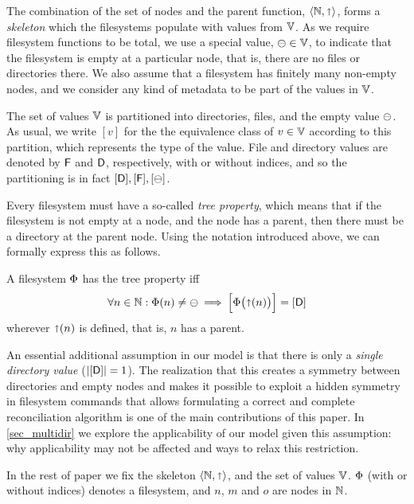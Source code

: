 
The combination of the set of nodes and the parent function,
$\langle \mathbb{N}, \mathord{\shortuparrow} \rangle$, forms a \emph{skeleton}
which the filesystems populate with values from $\mathbb{V}$.
As we require filesystem functions to be total,
we use a special value, $\ominus\in\mathbb{V}$, to indicate that the filesystem
is empty at a particular node, that is, there are no files or directories there.
We also assume that a filesystem has finitely many non-empty nodes,
and we consider any kind of metadata to be part of the values in $\mathbb{V}$.

\begin{mydef}
The set of values $\mathbb{V}$ is partitioned into directories, files, and the empty value $\ominus$.
As usual, we write $[v]$ for the the equivalence class of $v\in\mathbb{V}$ according to this partition,
which represents the type of the value.
File and directory values are denoted by $\mathsf{F}$ and $\mathsf{D}$, respectively,
with or without indices, and so the partitioning is in fact $[\mathsf{D}], [\mathsf{F}], [\ominus]$.
\end{mydef}


Every filesystem must have a so-called \emph{tree property}, which means that
if the filesystem is not empty at a node, and the node has a parent,
then there must be a directory at the parent node.
Using the notation introduced above, we can formally express this as follows.
\begin{mydef}
A filesystem $\Phi$ has the tree property iff
\[ \forall n\in\mathbb{N}:
\Phi(n) \neq \ominus \: \Longrightarrow \: \Big[\Phi\big(\mathord{\shortuparrow}({n})\big)\Big] = [\mathsf{D}] \]
wherever $\mathord{\shortuparrow}(n)$ is defined, that is, $n$ has a parent.
\end{mydef}


An essential additional assumption in our model is that there is only
a \emph{single directory value} ($|[\mathsf{D}]|=1$).
The realization that
this creates a symmetry between directories and empty nodes
and makes it possible to exploit a hidden symmetry in filesystem commands
that allows formulating a correct and complete reconciliation algorithm
is one of the main contributions of this paper.
In \cref{sec_multidir} we explore the applicability of our model given this assumption:
why applicability may not be affected and ways to relax this restriction.


In the rest of paper
we fix the skeleton $\langle\mathbb{N},\mathord{\shortuparrow}\rangle$,
and the set of values $\mathbb{V}$.
$\Phi$ (with or without indices) denotes a filesystem,
and $n$, $m$ and $o$ are nodes in $\mathbb{N}$.
